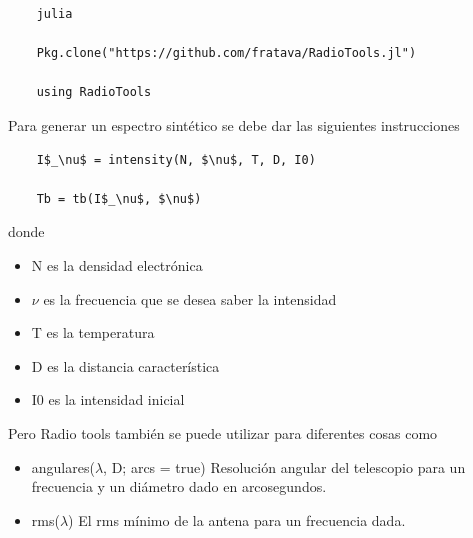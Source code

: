 \documentclass[a4paper]{article}
\begin{document}
\begin{verbatim}
    julia
    
    Pkg.clone("https://github.com/fratava/RadioTools.jl")
    
    using RadioTools
\end{verbatim}

Para generar un espectro sintético se debe dar las siguientes instrucciones

\begin{verbatim}
    I$_\nu$ = intensity(N, $\nu$, T, D, I0)
    
    Tb = tb(I$_\nu$, $\nu$)
\end{verbatim}

donde

\begin{itemize}
    \item N es la densidad electrónica
    \item $\nu$ es la frecuencia que se desea saber la intensidad
    \item T es la temperatura
    \item D es la distancia característica
    \item I0 es la intensidad inicial
\end{itemize}

Pero Radio tools también se puede utilizar para diferentes cosas como
\begin{itemize}
    \item angulares($\lambda$, D; arcs = true) Resolución angular del telescopio para un frecuencia y un diámetro dado en arcosegundos.
    \item rms($\lambda$) El rms mínimo de la antena para un frecuencia dada.
\end{itemize}
\end{document}
